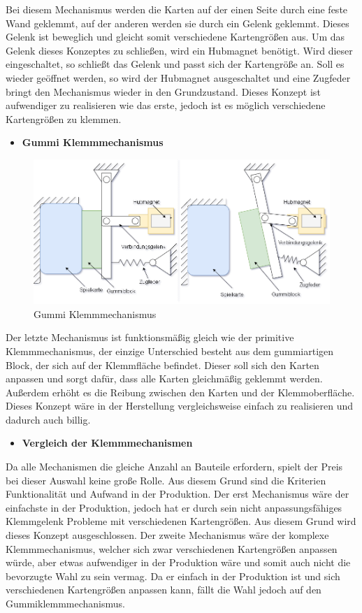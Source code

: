 Bei diesem Mechanismus werden die Karten auf der einen Seite durch eine feste Wand geklemmt, auf der anderen werden sie durch ein Gelenk geklemmt.
Dieses Gelenk ist beweglich und gleicht somit verschiedene Kartengrößen aus.
Um das Gelenk dieses Konzeptes zu schließen, wird ein Hubmagnet benötigt.
Wird dieser eingeschaltet, so schließt das Gelenk und passt sich der Kartengröße an.
Soll es wieder geöffnet werden, so wird der Hubmagnet ausgeschaltet und eine Zugfeder bringt den Mechanismus wieder in den Grundzustand.
Dieses Konzept ist aufwendiger zu realisieren wie das erste, jedoch ist es möglich verschiedene Kartengrößen zu klemmen.

\begin{itemize}
    \item \textbf{Gummi Klemmmechanismus}
\end{itemize}

\begin{figure}[H]
    \centering
    \includegraphics[scale=0.5,page=1]{fig/mech/Kartenausgabe_3}
    \caption{Gummi Klemmmechanismus}
\end{figure}

Der letzte Mechanismus ist funktionsmäßig gleich wie der primitive Klemmmechanismus, der einzige Unterschied besteht aus dem
gummiartigen Block, der sich auf der Klemmfläche befindet.
Dieser soll sich den Karten anpassen und sorgt dafür, dass alle Karten gleichmäßig geklemmt werden.
Außerdem erhöht es die Reibung zwischen den Karten und der Klemmoberfläche.
Dieses Konzept wäre in der Herstellung vergleichsweise einfach zu realisieren und dadurch auch billig.


\begin{itemize}
    \item \textbf{Vergleich der Klemmmechanismen}
\end{itemize}

Da alle Mechanismen die gleiche Anzahl an Bauteile erfordern, spielt der Preis bei dieser Auswahl keine große Rolle.
Aus diesem Grund sind die Kriterien Funktionalität und Aufwand in der Produktion.
Der erst Mechanismus wäre der einfachste in der Produktion, jedoch hat er durch sein nicht anpassungsfähiges Klemmgelenk Probleme mit verschiedenen Kartengrößen.
Aus diesem Grund wird dieses Konzept ausgeschlossen.
Der zweite Mechanismus wäre der komplexe Klemmmechanismus, welcher sich zwar verschiedenen Kartengrößen anpassen würde, aber etwas aufwendiger in der
Produktion wäre und somit auch nicht die bevorzugte Wahl zu sein vermag.
Da er einfach in der Produktion ist und sich verschiedenen Kartengrößen anpassen kann, fällt die Wahl jedoch auf den Gummiklemmmechanismus.

